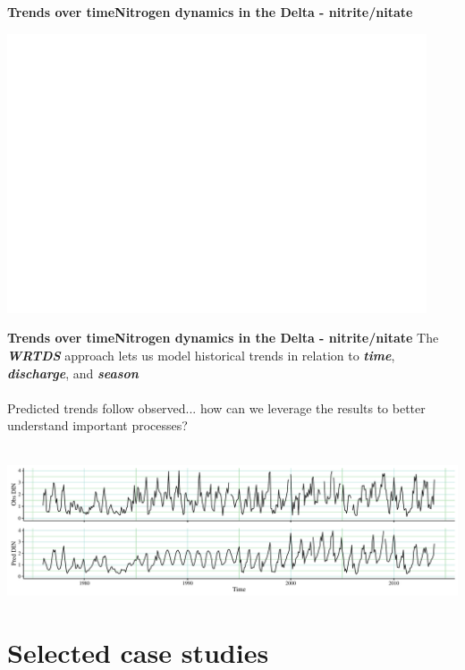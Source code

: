 \documentclass[serif]{beamer}\usepackage[]{graphicx}\usepackage[]{color}
\newcommand{\emtxt}[1]{\textbf{\textit{#1}}}
\begin{document}
\begin{frame}{\textbf{Trends over time}}{\textbf{Nitrogen dynamics in the Delta - nitrite/nitate}} 
\centerline{\includegraphics[width = 0.93\textwidth, page = 2]{fig/trndsperno23.pdf}}
\end{frame}



\begin{frame}{\textbf{Trends over time}}{\textbf{Nitrogen dynamics in the Delta - nitrite/nitate}} 
The \emtxt{WRTDS} approach lets us model historical trends in relation to \emtxt{time}, \emtxt{discharge}, and \emtxt{season}\\~\\
Predicted trends follow observed... how can we leverage the results to better understand important processes? \\~\\
\centerline{\includegraphics[width = \textwidth]{fig/ts_ex2.pdf}}
\end{frame}

\section{Selected case studies}
\end{document}
